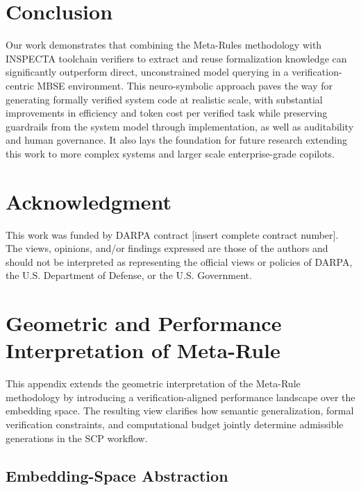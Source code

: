 \documentclass[conference]{IEEEtran}
\begin{document}
\section{Conclusion}
\label{sec:conclusion}

Our work demonstrates that combining the Meta-Rules methodology with INSPECTA toolchain verifiers to extract and reuse formalization knowledge can significantly outperform direct, unconstrained model querying in a verification-centric MBSE environment. This neuro-symbolic approach paves the way for generating formally verified system code at realistic scale, with substantial improvements in efficiency and token cost per verified task while preserving guardrails from the system model through implementation, as well as auditability and human governance. It also lays the foundation for future research extending this work to more complex systems and larger scale enterprise-grade copilots.

\section*{Acknowledgment}
This work was funded by DARPA contract [insert complete contract number]. The views, opinions, and/or findings expressed are those of the authors and should not be interpreted as representing the official views or policies of DARPA, the U.S. Department of Defense, or the U.S. Government.

\appendices
\appendices

\section{Geometric and Performance Interpretation of Meta-Rule }
\label{app:vsc}

This appendix extends the geometric interpretation of the Meta-Rule methodology by introducing a verification-aligned performance landscape over the embedding space. The resulting view clarifies how semantic generalization, formal verification constraints, and computational budget jointly determine admissible generations in the SCP workflow.

\subsection{Embedding-Space Abstraction}
\end{document}
